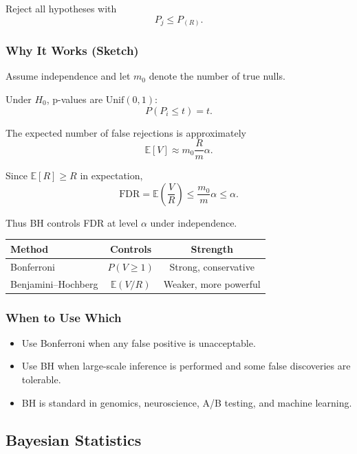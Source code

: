Reject all hypotheses with
\[
P_j \le P_{(R)}.
\]

\subsubsection*{Why It Works (Sketch)}

Assume independence and let $m_0$ denote the number of true nulls.

Under $H_0$, p-values are $\text{Unif}(0,1)$:
\[
P(P_i \le t) = t.
\]

The expected number of false rejections is approximately
\[
\mathbb{E}[V] \approx m_0 \frac{R}{m}\alpha.
\]

Since $\mathbb{E}[R] \ge R$ in expectation,
\[
\text{FDR}
= \mathbb{E}\!\left(\frac{V}{R}\right)
\le \frac{m_0}{m} \alpha
\le \alpha.
\]

Thus BH controls FDR at level $\alpha$ under independence.

\begin{center}
\begin{tabular}{lcc}
\hline
Method & Controls & Strength \\
\hline
Bonferroni & $P(V \ge 1)$ & Strong, conservative \\
Benjamini--Hochberg & $\mathbb{E}(V/R)$ & Weaker, more powerful \\
\hline
\end{tabular}
\end{center}

\subsubsection*{When to Use Which}

\begin{itemize}
\item Use Bonferroni when any false positive is unacceptable.
\item Use BH when large-scale inference is performed and some false discoveries are tolerable.
\item BH is standard in genomics, neuroscience, A/B testing, and machine learning.
\end{itemize}


\subsection{Bayesian Statistics}

